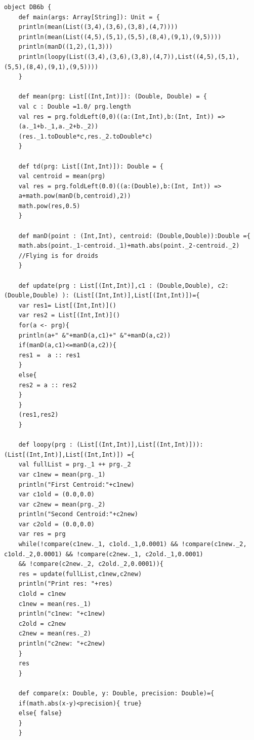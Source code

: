 \documentclass{article}
\theoremstyle{remark}
\begin{document}
	\begin{lstlisting}[caption = Task B]
	object DB6b {
	def main(args: Array[String]): Unit = {
	println(mean(List((3,4),(3,6),(3,8),(4,7))))
	println(mean(List((4,5),(5,1),(5,5),(8,4),(9,1),(9,5))))
	println(manD((1,2),(1,3)))
	println(loopy(List((3,4),(3,6),(3,8),(4,7)),List((4,5),(5,1),(5,5),(8,4),(9,1),(9,5))))
	}
	
	def mean(prg: List[(Int,Int)]): (Double, Double) = {
	val c : Double =1.0/ prg.length
	val res = prg.foldLeft(0,0)((a:(Int,Int),b:(Int, Int)) =>
	(a._1+b._1,a._2+b._2))
	(res._1.toDouble*c,res._2.toDouble*c)
	}
	
	def td(prg: List[(Int,Int)]): Double = {
	val centroid = mean(prg)
	val res = prg.foldLeft(0.0)((a:(Double),b:(Int, Int)) =>
	a+math.pow(manD(b,centroid),2))
	math.pow(res,0.5)
	}
	
	def manD(point : (Int,Int), centroid: (Double,Double)):Double ={
	math.abs(point._1-centroid._1)+math.abs(point._2-centroid._2)
	//Flying is for droids
	}
	
	def update(prg : List[(Int,Int)],c1 : (Double,Double), c2: (Double,Double) ): (List[(Int,Int)],List[(Int,Int)])={
	var res1= List[(Int,Int)]()
	var res2 = List[(Int,Int)]()
	for(a <- prg){
	println(a+" &"+manD(a,c1)+" &"+manD(a,c2))
	if(manD(a,c1)<=manD(a,c2)){
	res1 =  a :: res1
	}
	else{
	res2 = a :: res2
	}
	}
	(res1,res2)
	}
	
	def loopy(prg : (List[(Int,Int)],List[(Int,Int)])): (List[(Int,Int)],List[(Int,Int)]) ={
	val fullList = prg._1 ++ prg._2
	var c1new = mean(prg._1)
	println("First Centroid:"+c1new)
	var c1old = (0.0,0.0)
	var c2new = mean(prg._2)
	println("Second Centroid:"+c2new)
	var c2old = (0.0,0.0)
	var res = prg
	while(!compare(c1new._1, c1old._1,0.0001) && !compare(c1new._2, c1old._2,0.0001) && !compare(c2new._1, c2old._1,0.0001)
	&& !compare(c2new._2, c2old._2,0.0001)){
	res = update(fullList,c1new,c2new)
	println("Print res: "+res)
	c1old = c1new
	c1new = mean(res._1)
	println("c1new: "+c1new)
	c2old = c2new
	c2new = mean(res._2)
	println("c2new: "+c2new)
	}
	res
	}
	
	def compare(x: Double, y: Double, precision: Double)={
	if(math.abs(x-y)<precision){ true}
	else{ false}
	}
	}
	\end{lstlisting}
	
\end{document}
